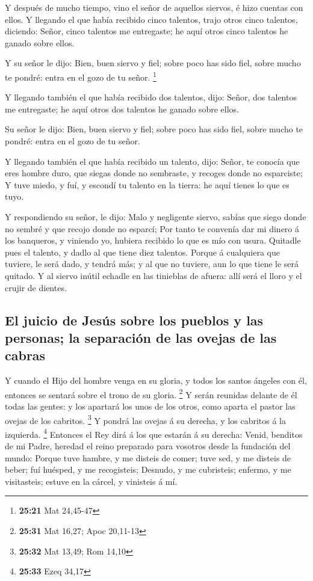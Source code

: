  Y después de mucho tiempo, vino el señor de aquellos
siervos, é hizo cuentas con ellos.  Y llegando el que
había recibido cinco talentos, trajo otros cinco talentos, diciendo:
Señor, cinco talentos me entregaste; he aquí otros cinco talentos he
ganado sobre ellos.

 Y su señor le dijo: Bien, buen siervo y fiel; sobre poco
has sido fiel, sobre mucho te pondré: entra en el gozo de tu señor.
\footnote{\textbf{25:21} Mat 24,45-47}

 Y llegando también el que había recibido dos talentos,
dijo: Señor, dos talentos me entregaste; he aquí otros dos talentos he
ganado sobre ellos.

 Su señor le dijo: Bien, buen siervo y fiel; sobre poco
has sido fiel, sobre mucho te pondré: entra en el gozo de tu señor.

 Y llegando también el que había recibido un talento,
dijo: Señor, te conocía que eres hombre duro, que siegas donde no
sembraste, y recoges donde no esparciste;  Y tuve miedo,
y fuí, y escondí tu talento en la tierra: he aquí tienes lo que es tuyo.

 Y respondiendo su señor, le dijo: Malo y negligente
siervo, sabías que siego donde no sembré y que recojo donde no esparcí;
 Por tanto te convenía dar mi dinero á los banqueros, y
viniendo yo, hubiera recibido lo que es mío con usura. 
Quitadle pues el talento, y dadlo al que tiene diez talentos.
 Porque á cualquiera que tuviere, le será dado, y tendrá
más; y al que no tuviere, aun lo que tiene le será quitado.
 Y al siervo inútil echadle en las tinieblas de afuera:
allí será el lloro y el crujir de dientes.

\hypertarget{el-juicio-de-jesuxfas-sobre-los-pueblos-y-las-personas-la-separaciuxf3n-de-las-ovejas-de-las-cabras}{%
\subsection{El juicio de Jesús sobre los pueblos y las personas; la
separación de las ovejas de las
cabras}\label{el-juicio-de-jesuxfas-sobre-los-pueblos-y-las-personas-la-separaciuxf3n-de-las-ovejas-de-las-cabras}}

 Y cuando el Hijo del hombre venga en su gloria, y todos
los santos ángeles con él, entonces se sentará sobre el trono de su
gloria. \footnote{\textbf{25:31} Mat 16,27; Apoc 20,11-13}
 Y serán reunidas delante de él todas las gentes: y los
apartará los unos de los otros, como aparta el pastor las ovejas de los
cabritos. \footnote{\textbf{25:32} Mat 13,49; Rom 14,10} 
Y pondrá las ovejas á su derecha, y los cabritos á la izquierda.
\footnote{\textbf{25:33} Ezeq 34,17}  Entonces el Rey
dirá á los que estarán á su derecha: Venid, benditos de mi Padre,
heredad el reino preparado para vosotros desde la fundación del mundo:
 Porque tuve hambre, y me disteis de comer; tuve sed, y
me disteis de beber; fuí huésped, y me recogisteis; 
Desnudo, y me cubristeis; enfermo, y me visitasteis; estuve en la
cárcel, y vinisteis á mí.

